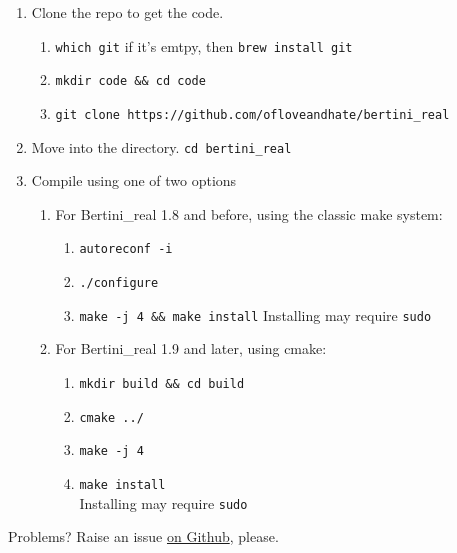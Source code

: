\begin{enumerate}
  \item Clone the repo to get the code.
  \begin{enumerate}
    \item {\tt which git}  if it's emtpy, then {\tt brew install git}
    \item {\tt mkdir code \&\& cd code}
    \item {\tt git clone https://github.com/ofloveandhate/bertini\_real}
  \end{enumerate}

  \item Move into the directory.  {\tt cd bertini\_real}

  \item Compile using one of two options
    \begin{enumerate}
      \item For Bertini\_real 1.8 and before, using the classic make system:
      \begin{enumerate}
        \item {\tt autoreconf -i}
        \item {\tt ./configure}
        \item {\tt make -j 4 \&\& make install} Installing may require \verb|sudo|
      \end{enumerate} 

      \item For Bertini\_real 1.9 and later, using cmake:
      \begin{enumerate}
        \item \verb|mkdir build && cd build|
        \item \verb|cmake ../|
        \item \verb|make -j 4|
        \item \verb|make install| \\ Installing may require \verb|sudo|
      \end{enumerate}


    \end{enumerate}

\end{enumerate}


Problems?  Raise an issue \href{https://github.com/ofloveandhate/bertini_real/issues}{on Github}, please. 

